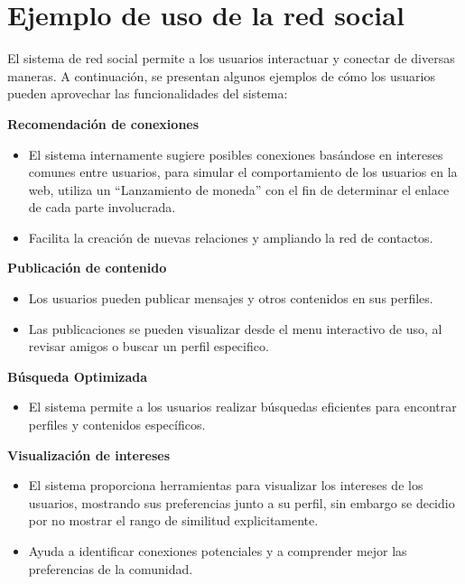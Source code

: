 \section{Ejemplo de uso de la red social}
El sistema de red social permite a los usuarios interactuar y conectar de diversas maneras. A continuación, se presentan algunos ejemplos de cómo los usuarios pueden aprovechar las funcionalidades del sistema:

\textbf{Recomendación de conexiones}
\begin{itemize}
    \item El sistema internamente sugiere posibles conexiones basándose en intereses comunes entre usuarios, para simular el comportamiento de los usuarios en la web, utiliza un ``Lanzamiento de moneda'' con el fin de determinar el enlace de cada parte involucrada.
    \item Facilita la creación de nuevas relaciones y ampliando la red de contactos.
\end{itemize}

\textbf{Publicación de contenido}
\begin{itemize}
    \item Los usuarios pueden publicar mensajes y otros contenidos en sus perfiles.
    \item Las publicaciones se pueden visualizar desde el menu interactivo de uso, al revisar amigos o buscar un perfil especifico.
\end{itemize}

\textbf{Búsqueda Optimizada}
\begin{itemize}
    \item El sistema permite a los usuarios realizar búsquedas eficientes para encontrar perfiles y contenidos específicos.
\end{itemize}

\textbf{Visualización de intereses}
\begin{itemize}
    \item El sistema proporciona herramientas para visualizar los intereses de los usuarios, mostrando sus preferencias junto a su perfil, sin embargo se decidio por no mostrar el rango de similitud explicitamente.
    \item Ayuda a identificar conexiones potenciales y a comprender mejor las preferencias de la comunidad.
\end{itemize}
